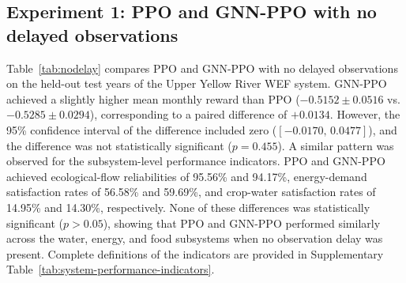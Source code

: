 \documentclass [a4paper,fleqn] {cas-dc}
\begin{document}

\subsection{Experiment 1: PPO and GNN-PPO with no delayed observations}
\label{sec42}
Table~\ref{tab:nodelay} compares PPO and GNN-PPO with no delayed observations on the held-out test years of the Upper Yellow River WEF system. GNN-PPO achieved a slightly higher mean monthly reward than PPO ($-0.5152 \pm 0.0516$ vs. $-0.5285 \pm 0.0294$), corresponding to a paired difference of $+0.0134$. However, the 95\% confidence interval of the difference included zero ($[-0.0170,\,0.0477]$), and the difference was not statistically significant ($p=0.455$). A similar pattern was observed for the subsystem-level performance indicators. PPO and GNN-PPO achieved ecological-flow reliabilities of 95.56\% and 94.17\%, energy-demand satisfaction rates of 56.58\% and 59.69\%, and crop-water satisfaction rates of 14.95\% and 14.30\%, respectively. None of these differences was statistically significant ($p>0.05$), showing that PPO and GNN-PPO performed similarly across the water, energy, and food subsystems when no observation delay was present. Complete definitions of the indicators are provided in Supplementary Table~\ref{tab:system-performance-indicators}.
\end{document}
